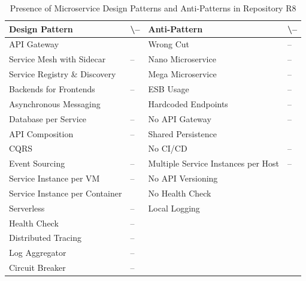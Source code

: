 \documentclass{Configuration_Files/PoliMi3i_thesis}
\newcommand{\cmark}{\ding{51}}%
\begin{document}
\begin{table}[H]
\centering 
    \begin{tabular}{ 
  | >{\centering\arraybackslash} m{16em} 
  | >{\centering\arraybackslash} m{2.2em} 
  | >{\centering\arraybackslash} m{16em} 
  | >{\centering\arraybackslash} m{2.2em} | }
    \hline
    \rowcolor{bluepoli!40}
    \textbf{Design Pattern} & \cmark \textbackslash – & \textbf{Anti-Pattern} & \cmark \textbackslash – \T\B \\
    \hline \hline
    API Gateway & \cmark & Wrong Cut & – \T\B\\
    \hline
    \rowcolor{bluepoli!10}
    Service Mesh with Sidecar & – & Nano Microservice & – \T\B \\
    \hline
    Service Registry \& Discovery & \cmark & Mega Microservice & – \T\B \\
    \hline
    \rowcolor{bluepoli!10}
    Backends for Frontends & – & ESB Usage & – \T\B \\
    \hline
    Asynchronous Messaging & \cmark & Hardcoded Endpoints & – \T\B \\
    \hline
    \rowcolor{bluepoli!10}
    Database per Service & – & No API Gateway & – \T\B \\
    \hline
    API Composition & – & Shared Persistence & \cmark \T\B \\
    \hline
    \rowcolor{bluepoli!10}
    CQRS & \cmark & No CI/CD & – \T\B \\
    \hline
    Event Sourcing & – & Multiple Service Instances per Host & – \T\B \\
    \hline
    \rowcolor{bluepoli!10}
    Service Instance per VM & – & No API Versioning & \cmark \T\B \\
    \hline
    Service Instance per Container & \cmark & No Health Check & \cmark \T\B \\
    \hline
    \rowcolor{bluepoli!10}
    Serverless & – & Local Logging & \cmark \T\B \\
    \hline
    Health Check & – &  & \T\B \\
    \hline
    \rowcolor{bluepoli!10}
    Distributed Tracing & – & & \T\B \\
    \hline
    Log Aggregator & – &  & \T\B \\
    \hline
    \rowcolor{bluepoli!10}
    Circuit Breaker & – &  & \T\B \\
    \hline
    \end{tabular}
    \\[10pt]
    \caption{Presence of Microservice Design Patterns and Anti-Patterns in Repository R8}
    \label{table:R8_result}
\end{table}
\end{document}
